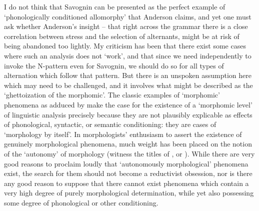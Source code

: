 \documentclass[output=paper,
modfonts
]{LSP/langsci}
\begin{document}
I do not think that Savognin can be presented as the perfect example of
`phonologically conditioned allomorphy' that Anderson claims, and yet
one must ask whether Anderson's insight -- that right across the grammar
there is a close correlation between stress and the selection of
alternants, might be at risk of being abandoned too lightly. My
criticism has been that there exist some cases where such an analysis
does not `work', and that since we need independently to invoke the
N-pattern even for Savognin, we should do so for all types of
alternation which follow that pattern. But there is an unspoken
assumption here which may need to be challenged, and it involves what
might be described as the `ghettoization of the morphomic'. The classic
examples of `morphomic' phenomena as adduced by \citet{Aronoff94:book} make the
case for the existence of a `morphomic level' of linguistic analysis
precisely because they are not plausibly explicable as effects of
phonological, syntactic, or semantic conditioning: they are cases of
`morphology by itself'. In morphologists' enthusiasm to assert the
existence of genuinely morphological phenomena, much weight has been
placed on the notion of the `autonomy' of morphology (witness the titles
of \citealt{maiden2005}, or \citealt{maiden2011}). While there are very good
reasons to proclaim loudly that `autonomously morphological' phenomena
exist, the search for them should not become a reductivist obsession,
nor is there any good reason to suppose that there cannot exist
phenomena which contain a very high degree of purely morphological
determination, while yet also possessing some degree of phonological or
other conditioning.
\end{document}
